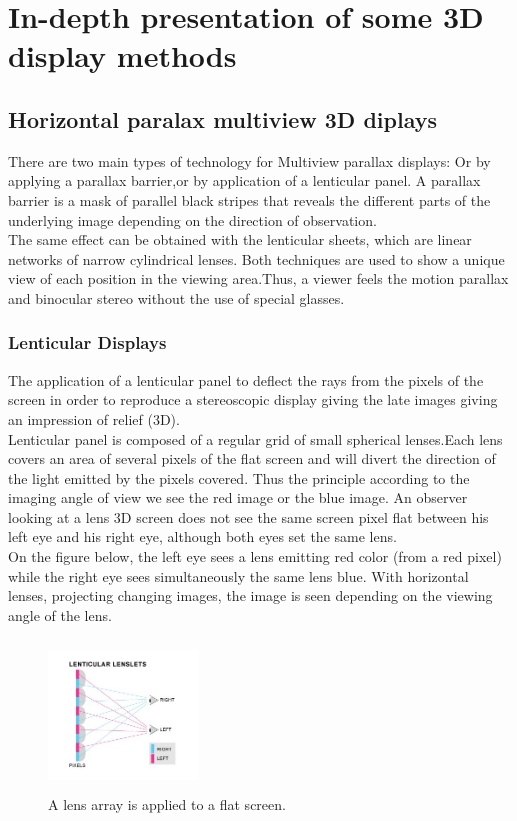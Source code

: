 \section{In-depth presentation of some 3D display methods}
\subsection{Horizontal paralax multiview 3D diplays} 
There are two main types of technology for Multiview parallax displays: Or by applying a parallax barrier,or by application of a lenticular panel.
A parallax barrier is a mask of parallel black stripes that reveals the different parts of the underlying image depending on the direction of observation.\\ The same effect can be obtained with the lenticular sheets, which are linear networks of narrow cylindrical lenses. Both techniques are used to show a unique view of each position in the viewing area.Thus, a viewer feels the motion parallax and binocular stereo without the use of special glasses. 
\subsubsection{Lenticular Displays}
The application of a lenticular panel to deflect the rays from the pixels of the screen in order to reproduce a stereoscopic display giving the late images giving an impression of relief (3D).\\ Lenticular panel is composed of a regular grid of small spherical lenses.Each lens covers an area of several pixels of the flat screen and will divert the direction of the light emitted by the pixels covered.
Thus the principle according to the imaging angle of view we see the red image or the blue image. An observer looking at a lens 3D screen does not see the same screen pixel flat between his left eye and his right eye, although both eyes set the same lens.\\
On the figure below, the left eye sees a lens emitting red color (from a red pixel) while the right eye sees simultaneously the same lens blue.
With horizontal lenses, projecting changing images, the image is seen depending on the viewing angle of the lens.


\begin{figure}[h!]
\begin{center}
\begin{minipage}{1\linewidth}
\centering\includegraphics[width=4cm,height=4cm]{image/lentuc.jpg}
\caption{A lens array is applied to a flat screen.}
\end{minipage}
\end{center}
\end{figure}
